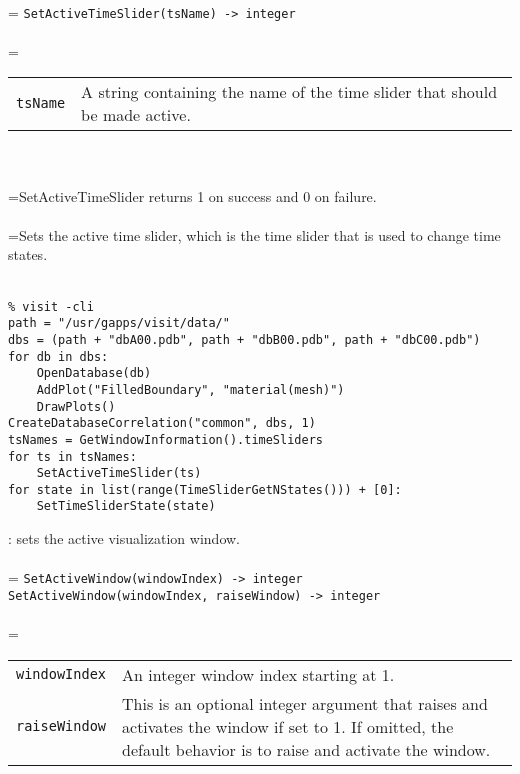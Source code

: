 \documentclass[10pt,a4paper]{report}
\begin{document}
 \\ 
\hangindent=\parindent 
\verb!SetActiveTimeSlider(tsName) -> integer!\\ [-3mm]

 \\ 
\hangindent=\parindent 
\begin{tabular}{lp{9cm}}
\verb!tsName! & A string containing the name of the time slider that should be made active. \\
\end{tabular} \\[-2mm]


 \\ 
\hangindent=\parindent SetActiveTimeSlider returns 1 on success and 0 on failure. \\[-3mm] 

 \\ 
\hangindent=\parindent Sets the active time slider, which is the time slider that is used to change time states. \\[-3mm] 

\\[-6mm]
\begin{verbatim}% visit -cli
path = "/usr/gapps/visit/data/"
dbs = (path + "dbA00.pdb", path + "dbB00.pdb", path + "dbC00.pdb")
for db in dbs:
    OpenDatabase(db)
    AddPlot("FilledBoundary", "material(mesh)")
    DrawPlots()
CreateDatabaseCorrelation("common", dbs, 1)
tsNames = GetWindowInformation().timeSliders
for ts in tsNames:
    SetActiveTimeSlider(ts)
for state in list(range(TimeSliderGetNStates())) + [0]:
    SetTimeSliderState(state)
\end{verbatim}
\newpage


{}
: sets the active visualization window.\\[-3mm]

 \\ 
\hangindent=\parindent 
\verb!SetActiveWindow(windowIndex) -> integer!\\ 
\verb!SetActiveWindow(windowIndex, raiseWindow) -> integer!\\ [-3mm]

 \\ 
\hangindent=\parindent 
\begin{tabular}{lp{9cm}}
\verb!windowIndex! & An integer window index starting at 1. \\
\verb!raiseWindow! & This is an optional integer argument that raises and activates the window if set to 1. If omitted, the default behavior is to raise and activate the window. \\
\end{tabular} \\[-2mm]
\end{document}
